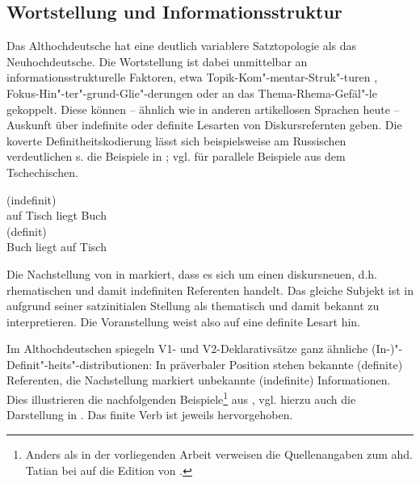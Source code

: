 \subsection{Wortstellung und Informationsstruktur} \label{is-ahd.}

Das Althochdeutsche hat eine deutlich variablere Satztopologie als das Neuhochdeutsche. Die Wortstellung ist dabei unmittelbar an informationsstrukturelle Faktoren, etwa  Topik-Kom"-mentar-Struk"-turen
\parencite{Hinterholzl2005,Ramers2005,Solf2008}, Fokus-Hin"-ter"-grund-Glie"-derungen \parencite{Petrova2009} oder an das Thema-Rhema-Gefäl"-le \parencite{Leiss2000} gekoppelt. Diese können -- ähnlich wie in anderen artikellosen Sprachen heute -- Auskunft über indefinite oder definite Lesarten von Diskursrefernten geben. Die koverte Definitheitskodierung lässt sich beispielsweise am Russischen verdeutlichen s. die Beispiele in  \parencite[s.][191]{Szczepaniak2015};  vgl.  \textcite[5]{Leiss2000} für parallele Beispiele aus dem Tschechischen. 

\begin{exe}
	\ex \label{ex:is}   
	\begin{xlist}
		\ex \label{ex:is-indef} 
		\gll {}    (indefinit) \\
		auf Tisch liegt Buch\\
		\trans {}
		\ex \label{ex:is-def} 
		\gll {}    (definit) \\
		Buch liegt auf Tisch\\
		\trans {}
	\end{xlist}
\end{exe}

\noindent
Die Nachstellung von  in  markiert, dass es sich um einen diskursneuen, d.h. rhematischen und damit indefiniten Referenten handelt. Das gleiche Subjekt ist in  aufgrund seiner  satzinitialen Stellung als thematisch und damit bekannt zu interpretieren. Die Voranstellung weist also auf eine definite Lesart hin.

Im Althochdeutschen spiegeln V1- und V2-Deklarativsätze ganz ähnliche (In-)"-Definit"-heits"-distributionen: In präverbaler Position stehen bekannte (definite) Referenten, die Nachstellung markiert unbekannte (indefinite) Informationen. Dies illustrieren die nachfolgenden Beispiele\footnote{Anders als in der vorliegenden Arbeit verweisen die Quellenangaben zum ahd. Tatian bei \textcite{Hinterholzl2010} auf die Edition von \textcite{Masser1994}.} aus \textcite[316]{Hinterholzl2010}, vgl. hierzu auch die Darstellung in \textcite[46f.]{Ferraresi2014}. Das finite Verb ist jeweils hervorgehoben.

